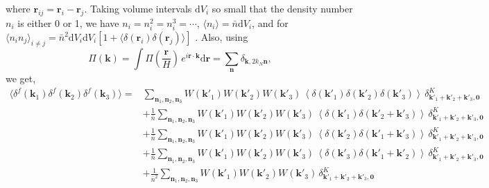 \documentclass[a4paper,fleqn,usenatbib]{mnras}
\begin{document}
\begin{minipage}{1\columnwidth}
where $\mathbf{r}_{ij}=\mathbf{r}_i-\mathbf{r}_j$. Taking volume intervals $\text{d}V_i$ so small 
that the density number $n_i$ is either 0 or 1, we have $n_i=n_i^2=n_i^3=\cdots$, 
$\langle n_i\rangle=\bar{n}\text{d}V_i$, and for 
$\langle n_i n_j\rangle_{i\neq j} = \bar{n}^2 \text{d}V_i \text{d}V_i
\left[1+\langle\delta(\mathbf{r}_i) \delta(\mathbf{r}_j)\rangle\right]$ \citep{Peebles1980,Jing2005}. 
Also, using 
\begin{equation}
  \Pi(\mathbf{k}) = \int \Pi\left(\frac{\mathbf{r}}{H}\right)\,e^{i\mathbf{r}\cdot\mathbf{k}} \text{d}\mathbf{r}
  =\sum_{\mathbf{n}} \delta_{\mathbf{k},2k_N\mathbf{n}}, 
\end{equation}
we get,
\begin{align}
  \langle \delta^f(\mathbf{k}_1) \delta^f(\mathbf{k}_2) \delta^f(\mathbf{k}_3) \rangle =&
  \sum_{\mathbf{n}_1,\mathbf{n}_2,\mathbf{n}_3} 
  W(\mathbf{k'}_1) W(\mathbf{k'}_2) W(\mathbf{k'}_3) \, 
  \left\langle\delta\left(\mathbf{k'}_1\right)\delta\left(\mathbf{k'}_2\right)\delta\left(\mathbf{k'}_3\right)\right\rangle \,
  \delta^K_{\mathbf{k'}_1+\mathbf{k'}_2+\mathbf{k'}_3,\mathbf{0}} \nonumber\\
  & +\frac{1}{\bar{n}} \sum_{\mathbf{n}_1,\mathbf{n}_2,\mathbf{n}_3} W(\mathbf{k'}_1) W(\mathbf{k'}_2) W(\mathbf{k'}_3) \,  
  \left\langle \delta\left(\mathbf{k'}_1\right) \delta\left(\mathbf{k'}_2+\mathbf{k'}_3\right) \right\rangle \,
  \delta^K_{\mathbf{k'}_1+\mathbf{k'}_2+\mathbf{k'}_3,\mathbf{0}}\nonumber\\
  & +\frac{1}{\bar{n}} \sum_{\mathbf{n}_1,\mathbf{n}_2,\mathbf{n}_3} W(\mathbf{k'}_1) W(\mathbf{k'}_2) W(\mathbf{k'}_3) \,
  \left\langle \delta\left(\mathbf{k'}_2\right) \delta\left(\mathbf{k'}_1+\mathbf{k'}_3\right) \right\rangle \,
  \delta^K_{\mathbf{k'}_1+\mathbf{k'}_2+\mathbf{k'}_3,\mathbf{0}} \nonumber\\
  & +\frac{1}{\bar{n}} \sum_{\mathbf{n}_1,\mathbf{n}_2,\mathbf{n}_3} W(\mathbf{k'}_1) W(\mathbf{k'}_2) W(\mathbf{k'}_3) \, 
  \left\langle \delta\left(\mathbf{k'}_3\right) \delta\left(\mathbf{k'}_1+\mathbf{k'}_2\right) \right\rangle \,
  \delta^K_{\mathbf{k'}_1+\mathbf{k'}_2+\mathbf{k'}_3,\mathbf{0}} \nonumber\\
  &+ \frac{1}{\bar{n}^2} \sum_{\mathbf{n}_1,\mathbf{n}_2,\mathbf{n}_3} W(\mathbf{k'}_1) W(\mathbf{k'}_2) W(\mathbf{k'}_3) \,
  \delta^K_{\mathbf{k'}_1+\mathbf{k'}_2+\mathbf{k'}_3,\mathbf{0}}
\end{align}


\end{minipage}
\end{document}
